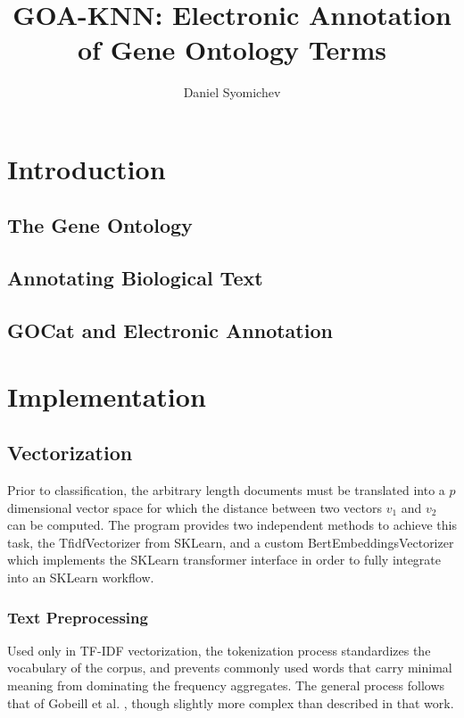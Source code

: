 \documentclass[11pt]{article} %
\title{GOA-KNN: Electronic Annotation of Gene Ontology Terms}
\author{Daniel Syomichev}
\theoremstyle{plain}
\theoremstyle{definition}
\begin{document}
\maketitle

\declaration

\begin{abstract}
\end{abstract}

\section{Introduction}

\subsection{The Gene Ontology}

\subsection{Annotating Biological Text}

\subsection{GOCat and Electronic Annotation}

\section{Implementation}

\subsection{Vectorization}

Prior to classification, the arbitrary length documents must be translated into a \(p\) dimensional vector space for which the distance between two vectors \(v_1\) and \(v_2\) can be computed.  The program provides two independent methods to achieve this task, the TfidfVectorizer from SKLearn, and a custom BertEmbeddingsVectorizer which implements the SKLearn transformer interface in order to fully integrate into an SKLearn workflow.

\subsubsection{Text Preprocessing}

Used only in TF-IDF vectorization, the tokenization process standardizes the vocabulary of the corpus, and prevents commonly used words that carry minimal meaning from dominating the frequency aggregates. The general process follows that of Gobeill et al. \cite{gobeill/2013/managing}, though slightly more complex than described in that work.
\end{document}
